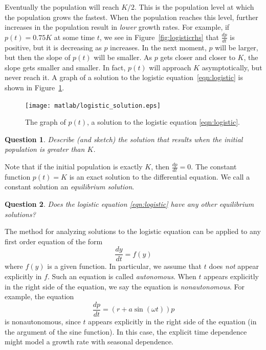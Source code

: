 \documentclass[reqno]{immbook}
\newtheorem{question}{Question}
\begin{document}
Eventually the population will reach $K/2$.  This is the population
level at which the population grows the fastest.
When the population reaches this level, further increases in the
population result in \emph{lower} growth rates.
For example, if $p(t) = 0.75K$ at some time $t$, we see in
Figure~\ref{fig:logisticrhs} that $\frac{dp}{dt}$ is positive, but it is
decreasing as $p$ increases.  In the next moment, $p$ will be larger,
but then the slope of $p(t)$ will be smaller.
As $p$ gets closer and closer to $K$, the slope gets smaller and smaller.
In fact, $p(t)$ will approach $K$ asymptotically, but never reach it.
A graph of a solution to the logistic equation~\eqref{eqn:logistic} is
shown in Figure~\ref{fig:logisticsol}.
\begin{figure}
\centerline{\texttt{[image: matlab/logistic\_solution.eps]}} 
\caption{The graph of $p(t)$, a solution to the logistic
equation \eqref{eqn:logistic}.}
\label{fig:logisticsol}
\end{figure}

\begin{question}
Describe (and sketch) the solution that
results when the initial population is greater than $K$.
\end{question}

Note that if the initial population is exactly $K$, then
$\frac{dp}{dt} = 0$.  The constant function $p(t)=K$ is an
exact solution to the differential equation.
We call a constant solution an
\emph{equilibrium solution}.

\begin{question}
Does the logistic equation \eqref{eqn:logistic} have any other
equilibrium solutions?
\end{question}

The method for analyzing solutions to the logistic equation can be
applied to any first order equation of the form
\begin{equation}
   \frac{dy}{dt} = f(y)
\end{equation}
where $f(y)$ is a given function.
In particular, we assume that $t$ does \emph{not} appear explicitly
in $f$.  Such an equation is called \emph{autonomous}.
When $t$ appears explicitly in the right side of the equation,
we say the equation is \emph{nonautonomous}.
For example, the equation
\begin{equation}
  \frac{dp}{dt} = (r+a \sin(\omega t))p
\end{equation}
is nonautonomous, since $t$ appears explicitly in the right side of the
equation (in the argument of the sine function).
In this case, the explicit time dependence might model a growth
rate with seasonal dependence.
\end{document}
